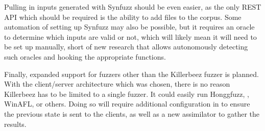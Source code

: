 Pulling in inputs generated with Synfuzz should be even easier, as the only
REST API which should be required is the ability to add files to the corpus.
Some automation of setting up Synfuzz may also be possible, but it requires an
oracle to determine which inputs are valid or not, which will likely mean it
will need to be set up manually, short of new research that allows
autonomously detecting such oracles and hooking the appropriate functions.

Finally, expanded support for fuzzers other than the Killerbeez fuzzer is planned. With
the client/server architecture which was chosen, there is no reason Killerbeez
has to be limited to a single fuzzer.  It could easily run Honggfuzz,
\AFL{}, WinAFL, or others.  Doing so will require additional configuration in
\BOINC{} to ensure the previous state is sent to the \BOINC{} clients, as well
as a new \BOINC{} assimilator to gather the results.








